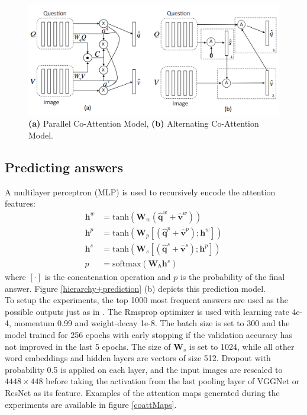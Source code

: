 \documentclass{article}
\begin{document}
    \begin{figure}[ht]
    	\centering
            \includegraphics[width=0.75\linewidth]{coattModels.PNG}
    	\caption{\textbf{(a)} Parallel Co-Attention Model, \textbf{(b)} Alternating Co-Attention Model.}
    	\label{coattModels}
    \end{figure}

\subsection{Predicting answers}
A multilayer perceptron (MLP) is used to recursively encode the attention features:
\begin{align*}
    \bm{h}^w &= \text{tanh}(\bm{W}_w(\hat{\bm{q}}^w + \hat{\bm{v}}^w))\\
    \bm{h}^p &= \text{tanh}(\bm{W}_p[(\hat{\bm{q}}^p + \hat{\bm{v}}^p);\bm{h}^w])\\
    \bm{h}^s &= \text{tanh}(\bm{W}_s[(\hat{\bm{q}}^s + \hat{\bm{v}}^s);\bm{h}^p])\\
    p &= \text{softmax}(\bm{W}_h\bm{h}^s)
\end{align*}
where $[\cdot]$ is the concatenation operation and $p$ is the probability of the final answer. Figure \ref{hierarchy+prediction} (b) depicts this prediction model.\\
To setup the experiments, the top 1000 most frequent answers are used as the possible outputs just as in \citep{iccvAntol15}. The Rmsprop optimizer is used with learning rate 4e-4, momentum 0.99 and weight-decay 1e-8. The batch size is set to 300 and the model trained for 256 epochs with early stopping if the validation accuracy has not improved in the last 5 epochs. The size of $\bm{W}_s$ is set to 1024, while all other word embeddings and hidden layers are vectors of size 512. Dropout with probability 0.5 is applied on each layer, and the input images are rescaled to $4448 \times 448$ before taking the activation from the last pooling layer of VGGNet or ResNet as its feature. Examples of the attention maps generated during the experiments are available in figure \ref{coattMaps}.
\end{document}
